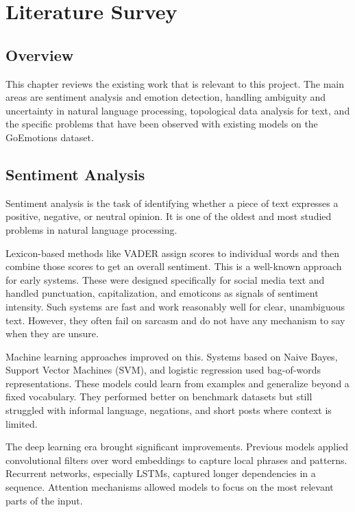 \chapter{Literature Survey}

\section{Overview}

This chapter reviews the existing work that is relevant to this project. The main areas are
sentiment analysis and emotion detection, handling ambiguity and uncertainty in natural language
processing, topological data analysis for text, and the specific problems that have been observed
with existing models on the GoEmotions dataset.

\section{Sentiment Analysis}

Sentiment analysis is the task of identifying whether a piece of text expresses a positive,
negative, or neutral opinion. It is one of the oldest and most studied problems in natural language
processing.

Lexicon-based methods like VADER assign scores to individual words and then combine those scores to get an overall sentiment. This is a well-known approach for early systems. These were designed specifically for social media text and handled punctuation, capitalization, and emoticons as signals of sentiment intensity.
Such systems are fast and work reasonably well for clear, unambiguous text. However, they
often fail on sarcasm and do not have any mechanism to say when they are unsure.

Machine learning approaches improved on this. Systems based on Naive Bayes, Support Vector
Machines (SVM), and logistic regression used bag-of-words representations. These models
could learn from examples and generalize beyond a fixed vocabulary. They performed better on
benchmark datasets but still struggled with informal language, negations, and short posts where
context is limited.

The deep learning era brought significant improvements. Previous models applied convolutional
filters over word embeddings to capture local phrases and patterns. Recurrent networks,
especially LSTMs, captured longer dependencies in a sequence. Attention mechanisms allowed
models to focus on the most relevant parts of the input.

